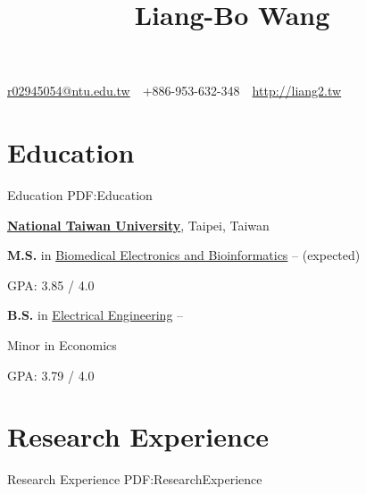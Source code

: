\documentclass[a4paper,12pt,oneside]{article}
\begin{document}

\title{Liang-Bo Wang}

\begin{subtitle}
\href{mailto:r02945054@ntu.edu.tw}
{r02945054@ntu.edu.tw}
\,\BulletSymbol\,
+886-953-632-348
\,\BulletSymbol\,
\href{http://liang2.tw}
{http://liang2.tw}
\end{subtitle}

\begin{body}


\section
{Education}
{Education}
{PDF:Education}

\href{http://www.ntu.edu.tw/english/index.html}
{\textbf{National Taiwan University}},
Taipei, Taiwan
\par
\textbf{M.S.} in
\href{http://www.bebi.ntu.edu.tw/English/index.html}
{Biomedical Electronics and Bioinformatics}
\hfill
{} --
 (expected)
\begin{detail}
    \begin{detailitem}
    \item GPA: 3.85 / 4.0
    \end{detailitem}
\end{detail}


\EntryGapNoBreak
\textbf{B.S.} in
\href{http://www.ee.ntu.edu.tw/en/}
{Electrical Engineering}
\hfill
{} --
\begin{detail}
    \begin{detailitem}
    \item Minor in Economics
    \item GPA: 3.79 / 4.0
    \end{detailitem}
\end{detail}


\section
{Research Experience}
{Research Experience}
{PDF:ResearchExperience}


\end{body}
\end{document}

